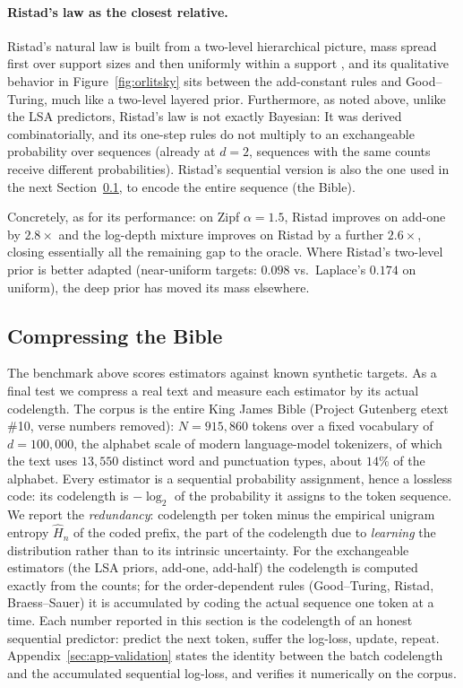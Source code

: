 \documentclass[11pt]{article}
\begin{document}
\paragraph{Ristad's law as the closest relative.}
Ristad’s natural law is built from a two-level hierarchical picture, mass
spread first over support sizes and then uniformly within a support
\cite{ristad1995natural}, and its qualitative behavior in
Figure~\ref{fig:orlitsky} sits between the add-constant rules and
Good--Turing, much like a two-level layered prior. 
Furthermore, as noted above,
unlike the LSA predictors, Ristad's law is not exactly Bayesian:
It was derived combinatorially, and its one-step rules do not multiply
to an exchangeable probability over sequences \cite{hutter2014} (already at \(d=2\),
sequences with the same counts receive different probabilities). Ristad's sequential version is also the one used in the next 
Section~\ref{sec:bible}, to encode the entire sequence (the Bible).

Concretely, as for its performance: on Zipf \(\alpha=1.5\), Ristad improves on add-one by
\(2.8\times\) and the log-depth mixture improves on Ristad by a further
\(2.6\times\), closing essentially all the remaining gap to the oracle.
Where Ristad's two-level prior is better adapted (near-uniform targets:
\(0.098\) vs.\ Laplace's \(0.174\) on uniform), the deep prior has moved its
mass elsewhere.
\subsection{Compressing the Bible}
\label{sec:bible}
The benchmark above scores estimators against known synthetic targets.  As
a final test we compress a real text and measure each estimator by its
actual codelength.  The corpus is the entire King James Bible (Project
Gutenberg etext \#10, verse numbers removed): \(N=915{,}860\) tokens over
a fixed vocabulary of \(d=100{,}000\), the alphabet scale of modern language-model tokenizers, of which the text uses
\(13{,}550\) distinct word and punctuation types, about \(14\%\) of the
alphabet.  Every estimator is a sequential probability assignment, hence a
lossless code: its codelength is \(-\log_2\) of the probability it assigns
to the token sequence.  We report the \emph{redundancy}: codelength per
token minus the empirical unigram entropy \(\hat H_n\) of the coded prefix, the part of the codelength due to \emph{learning} the distribution
rather than to its intrinsic uncertainty.  For the exchangeable estimators
(the LSA priors, add-one, add-half) the codelength is
computed exactly from the counts; for the order-dependent rules
(Good--Turing, Ristad, Braess--Sauer) it is accumulated by coding the
actual sequence one token at a time.
Each number reported in this section is the codelength of an honest
sequential predictor: predict the next token, suffer the log-loss, update,
repeat.  Appendix~\ref{sec:app-validation} states the identity between the
batch codelength and the accumulated sequential log-loss, and verifies it
numerically on the corpus.
\end{document}
